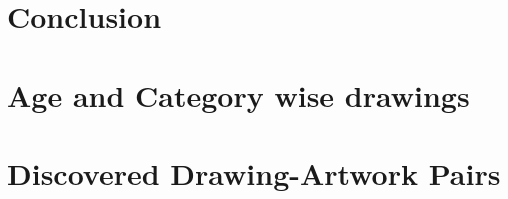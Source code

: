 \documentclass[a4paper,11pt,oneside]{report}
\begin{document}
\chapter{Conclusion}


\cleardoublepage
{}
\pagestyle{plain}
{}
\fancyfoot[C]{\thepage}
\printbibliography

\appendix
\chapter{Age and Category wise drawings}

\chapter{Discovered Drawing-Artwork Pairs}

%
%
\end{document}
